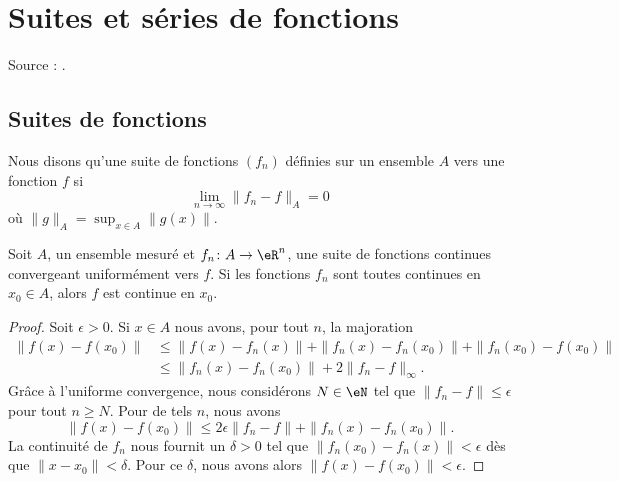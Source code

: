 

\section{Suites et séries de fonctions}
Source : \cite{TrenchRealAnalisys}.

\subsection{Suites de fonctions}

\begin{definition}
    Nous disons qu'une suite de fonctions \( (f_n)\) définies sur un ensemble \( A\)  vers une fonction \( f\) si
    \begin{equation}
        \lim_{n\to \infty} \| f_n-f \|_A=0
    \end{equation}
    où \( \| g \|_A=\sup_{x\in A}\| g(x) \|\).
\end{definition}

\begin{theorem}			\label{ThoUnigCvCont}
    Soit \( A\), un ensemble mesuré et \( f_n\colon A\to \eR^n\), une suite de fonctions continues convergeant uniformément vers \( f\). Si les fonctions \( f_n\) sont toutes continues en \( x_0\in A\), alors \( f\) est continue en \( x_0\).
\end{theorem}

\begin{proof}
    Soit \( \epsilon>0\). Si \( x\in A\) nous avons, pour tout \( n\), la majoration
    \begin{subequations}
        \begin{align}
            \| f(x)-f(x_0) \|&\leq \| f(x)-f_n(x) \|+\| f_n(x)-f_n(x_0) \|+\| f_n(x_0)-f(x_0) \|\\
            &\leq\| f_n(x)-f_n(x_0) \|+2\| f_n-f \|_{\infty}.
        \end{align}
    \end{subequations}
    Grâce à l'uniforme convergence, nous considérons \(N\in \eN\) tel que \( \| f_n-f \|\leq \epsilon\) pour tout \( n\geq N\). Pour de tels \( n\), nous avons
    \begin{equation}
        \| f(x)-f(x_0) \|\leq 2\epsilon\| f_n-f \|+\| f_n(x)-f_n(x_0) \|.
    \end{equation}
    La continuité de \( f_n\) nous fournit un \( \delta>0\) tel que \( \| f_n(x_0)-f_n(x) \|<\epsilon\) dès que \( \| x-x_0 \|<\delta\). Pour ce \( \delta\), nous avons alors \( \| f(x)-f(x_0) \|<\epsilon\).
\end{proof}

